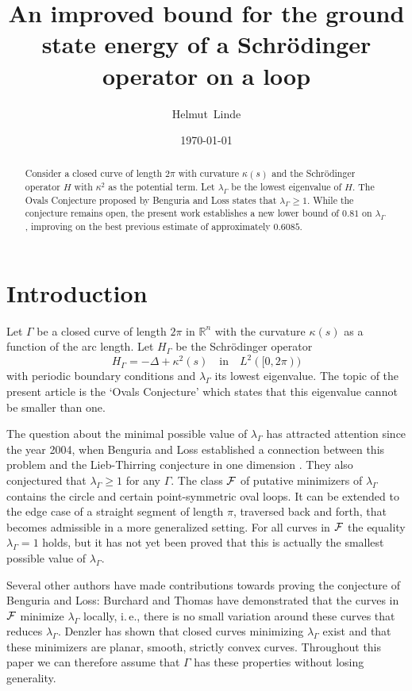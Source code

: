 \documentclass{article}
\title{An improved bound for the ground state energy of a Schrödinger operator on a loop}
\author{Helmut~Linde}
\date{\today}
\newcommand{\ite}{i.\,e.\xspace}
\newcommand{\R}{\mathbb{R}\xspace}
\begin{document}
\maketitle

\begin{abstract}
    Consider a closed curve of length $2\pi$ with curvature $\kappa(s)$ and the Schrödinger operator $H$ with $\kappa^2$ as the potential term. Let $\lambda_\Gamma$ be the lowest eigenvalue of $H$. The Ovals Conjecture proposed by Benguria and Loss states that $\lambda_\Gamma \ge 1$. While the conjecture remains open, the present work establishes a new lower bound of $0.81$ on $\lambda_\Gamma$, improving on the best previous estimate of approximately $0.6085$. 
\end{abstract}

\section{Introduction}

Let $\Gamma$ be a closed curve of length $2\pi$ in $\R^n$ with the curvature $\kappa(s)$ as a function of the arc length.
Let $H_\Gamma$ be the Schr\"odinger operator
\begin{equation} \label{eq:HGamma}
    H_\Gamma = - \Delta  + \kappa^2(s) \quad \mathrm{in} \quad L^2([0,2\pi))
\end{equation}
with periodic boundary conditions and $\lambda_\Gamma$ its lowest eigenvalue. The topic of the present article is the `Ovals Conjecture' which states that this eigenvalue cannot be smaller than one.

The question about the minimal possible value of $\lambda_\Gamma$ has attracted attention since the year 2004, when Benguria and Loss established a connection between this problem and the Lieb-Thirring conjecture in one dimension \cite{BenguriaLoss:Connection}.
They also conjectured that $\lambda_\Gamma \ge 1$ for any $\Gamma$. The class ${\cal F}$ of putative minimizers of $\lambda_\Gamma$ contains the circle and certain point-symmetric oval loops. It can be extended to the edge case of a straight segment of length $\pi$, traversed back and forth, that becomes admissible in a more generalized setting. For all curves in ${\cal F}$ the equality $\lambda_\Gamma = 1$ holds, but it has not yet been proved that this is actually the smallest possible value of $\lambda_\Gamma$.

Several other authors have made contributions towards proving the conjecture of Benguria and Loss: Burchard and Thomas have demonstrated \cite{BurchardThomas:Isoperimetric} that the curves in ${\cal F}$ minimize $\lambda_\Gamma$ locally, \ite, there is no small variation around these curves that reduces $\lambda_\Gamma$.
Denzler \cite{Denzler:Existence} has shown that closed curves minimizing $\lambda_\Gamma$ exist and that these minimizers are planar, smooth, strictly convex curves. Throughout this paper we can therefore assume that $\Gamma$ has these properties without losing generality.
\end{document}
